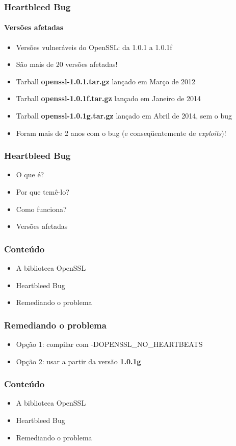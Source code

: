 \documentclass{beamer}
\begin{document}
\begin{frame}
	\frametitle{Heartbleed Bug}
	\framesubtitle{Versões afetadas}
	\begin{itemize}
		\item Versões vulneráveis do OpenSSL: da 1.0.1 a 1.0.1f
		\item São mais de 20 versões afetadas!
		\item Tarball \textbf{\textcolor{filecolor}{openssl-1.0.1.tar.gz}} lançado em Março de 2012
		\item Tarball \textbf{\textcolor{filecolor}{openssl-1.0.1f.tar.gz}} lançado em Janeiro de 2014
		\item Tarball \textbf{\textcolor{filecolor}{openssl-1.0.1g.tar.gz}} lançado em Abril de 2014, sem o bug
		\item Foram mais de 2 anos com o bug (e conseqüentemente de \textit{exploits})!
	\end{itemize}
\end{frame}

\begin{frame}
	\frametitle{Heartbleed Bug}
	\begin{itemize}
		\item \textcolor{covered}{O que é?}
		\item \textcolor{covered}{Por que temê-lo?}
		\item \textcolor{covered}{Como funciona?}
		\item \textcolor{covered}{Versões afetadas}
	\end{itemize}
\end{frame}

\begin{frame}
	\frametitle{Conteúdo}
	\begin{itemize}
		\item \textcolor{covered}{A biblioteca OpenSSL}
		\item \textcolor{covered}{Heartbleed Bug}
		\item Remediando o problema
	\end{itemize}
\end{frame}

\begin{frame}
	\frametitle{Remediando o problema}
	\begin{itemize}
		\item Opção 1: compilar com -DOPENSSL\_NO\_HEARTBEATS
		\item Opção 2: usar a partir da versão \textbf{1.0.1g}
	\end{itemize}
\end{frame}

\begin{frame}
	\frametitle{Conteúdo}
	\begin{itemize}
		\item \textcolor{covered}{A biblioteca OpenSSL}
		\item \textcolor{covered}{Heartbleed Bug}
		\item \textcolor{covered}{Remediando o problema}
	\end{itemize}
\end{frame}
\end{document}
